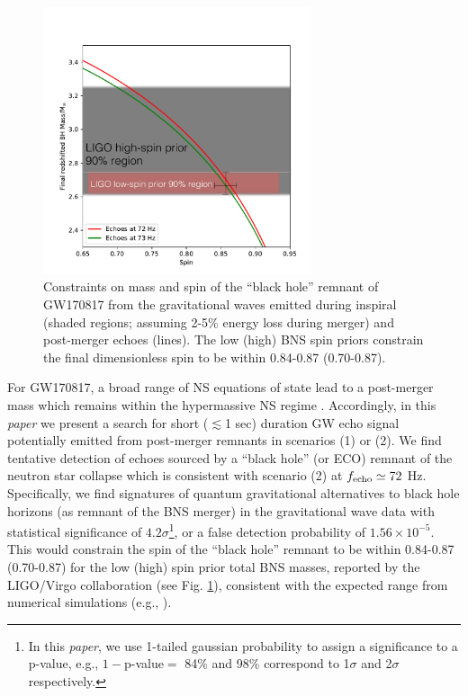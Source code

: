 \documentclass[12pt]{article}
\begin{document}
\begin{figure}[!tbp]
\centering
    \includegraphics[width=0.7\textwidth]{Mass_Spin.pdf}
 \caption{Constraints on mass and spin of the ``black hole'' remnant of GW170817 from the gravitational waves emitted during inspiral (shaded regions; assuming 2-5\% energy loss during merger) and post-merger echoes (lines). The low (high) BNS spin priors constrain the final dimensionless spin to be within 0.84-0.87 (0.70-0.87). }
 \label{NS-NS_12}
\end{figure}


For GW170817,  a broad range of NS equations of state lead to a post-merger mass which remains within the hypermassive NS regime \cite{TheLIGOScientific:2017qsa}. Accordingly, in this {\it paper} we present a search for short ($\lesssim$1 sec) duration GW echo signal potentially emitted from post-merger remnants in scenarios (1) or (2). We find tentative detection of echoes sourced by a ``black hole'' (or ECO) remnant of the neutron star collapse which is consistent with scenario (2) at $f_{\rm echo} \simeq 72$ Hz. 
Specifically, we find signatures of quantum gravitational alternatives to black hole horizons (as remnant of the BNS merger) in the gravitational wave data with statistical significance of $4.2\sigma$\footnote{In this {\it paper}, we use 1-tailed gaussian probability to assign a significance to a p-value, e.g., $1-$p-value$=$ 84\% and 98\% correspond to 1$\sigma$ and 2$\sigma$ respectively.}, or a false detection probability of $1.56 \times 10^{-5}$. This would constrain the spin of the ``black hole'' remnant to be within 0.84-0.87 (0.70-0.87) for the low (high) spin prior total BNS masses, reported by the LIGO/Virgo collaboration \cite{TheLIGOScientific:2017qsa} (see Fig. \ref{NS-NS_12}), consistent with the expected range from numerical simulations (e.g., \cite{Kastaun:2013mv}). 
\end{document}
